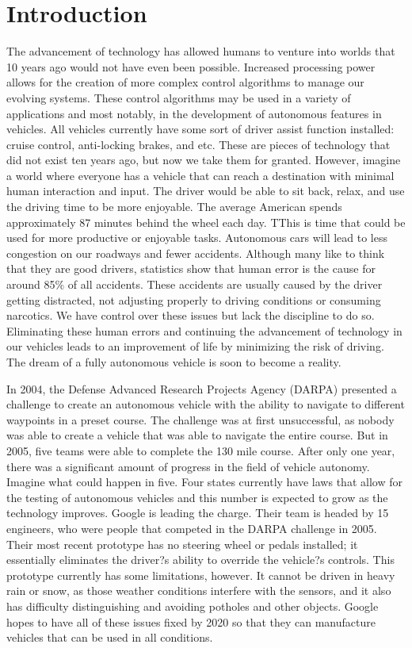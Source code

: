 \chapter{Introduction}

The advancement of technology has allowed humans to venture into worlds that 10 years ago would not have even been possible.  Increased processing power allows for the creation of more complex control algorithms to manage our evolving systems.  These control algorithms may be used in a variety of applications and most notably, in the development of autonomous features in vehicles.  All vehicles currently have some sort of driver assist function installed: cruise control, anti-locking brakes, and etc.  These are pieces of technology that did not exist ten years ago, but now we take them for granted.  However, imagine a world where everyone has a vehicle that can reach a destination with minimal human interaction and input.  The driver would be able to sit back, relax, and use the driving time to be more enjoyable.  The average American spends approximately 87 minutes behind the wheel each day.\cite{abcnews} TThis is time that could be used for more productive or enjoyable tasks.  Autonomous cars will lead to less congestion on our roadways and fewer accidents.  Although many like to think that they are good drivers, statistics show that human error is the cause for around 85\% of all accidents. \cite{aa1car} These accidents are usually caused by the driver getting distracted, not adjusting properly to driving conditions or consuming narcotics.  We have control over these issues but lack the discipline to do so. Eliminating these human errors and continuing the advancement of technology in our vehicles leads to an improvement of life by minimizing the risk of driving.  The dream of a fully autonomous vehicle is soon to become a reality.  

In 2004, the Defense Advanced Research Projects Agency (DARPA) presented a challenge to create an autonomous vehicle with the ability to navigate to different waypoints in a preset course.  The challenge was at first unsuccessful, as nobody was able to create a vehicle that was able to navigate the entire course.  But in 2005, five teams were able to complete the 130 mile course.  After only one year, there was a significant amount of progress in the field of vehicle autonomy.  Imagine what could happen in five.  Four states currently have laws that allow for the testing of autonomous vehicles and this number is expected to grow as the technology improves.  Google is leading the charge.  Their team is headed by 15 engineers, who were people that competed in the DARPA challenge in 2005.  Their most recent prototype has no steering wheel or pedals installed; it essentially eliminates the driver?s ability to override the vehicle?s controls.  This prototype currently has some limitations, however. It cannot be driven in heavy rain or snow, as those weather conditions interfere with the sensors, and it also has difficulty distinguishing and avoiding potholes and other objects.  Google hopes to have all of these issues fixed by 2020 so that they can manufacture vehicles that can be used in all conditions.  

